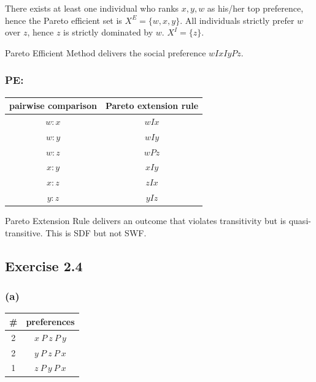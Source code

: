 \documentclass[a4paper]{article}
\begin{document}
There exists at least one individual who ranks $x, y, w$ as his/her top preference, hence the Pareto efficient set is $X^E=\{w, x, y\}$. All individuals strictly prefer $w$ over $z$, hence $z$ is strictly dominated by $w$. $X^I=\{z\}$.

Pareto Efficient Method delivers the social preference $wIxIyPz$.

\subsubsection*{PE:}

\begin{table}[!htbp]
    \centering
    \begin{tabular}{cc}
        pairwise comparison & Pareto extension rule \\
        \hline 
        $w:x$  & $wIx$           \\
        $w:y$  & $wIy$           \\
        $w:z$  & $wPz$           \\
        $x:y$  & $xIy$           \\
        $x:z$  & $zIx$           \\
        $y:z$  & $yIz$           \\
        \hline
    \end{tabular}
\end{table}

Pareto Extension Rule delivers an outcome that violates transitivity but is quasi-transitive. This is SDF but not SWF.

\subsection*{Exercise 2.4}

\subsubsection*{(a)}

\begin{table}[!htbp]
    \centering
    \begin{tabular}{c|c|}
        \# & preferences         \\ 
        \hline
        2  & $x\: P\: z\: P\: y$ \\
        2  & $y\: P\: z\: P\: x$ \\
        1  & $z\: P\: y\: P\: x$ \\
        \hline
    \end{tabular}
\end{table}
\end{document}
